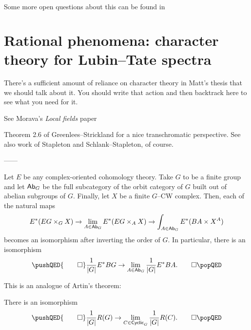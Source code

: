 \begin{remark}
Some more open questions about this can be found in 
\end{remark}








\section{Rational phenomena: character theory for Lubin--Tate spectra}

There's a sufficient amount of reliance on character theory in Matt's thesis that we should talk about it.  You should write that action and then backtrack here to see what you need for it.

See Morava's \textit{Local fields} paper

\begin{remark}
Theorem 2.6 of Greenlees--Strickland for a nice transchromatic perspective.  See also work of Stapleton and Schlank--Stapleton, of course.
\end{remark}


------

\begin{theorem}
Let $E$ be any complex-oriented cohomology theory.  Take $G$ to be a finite group and let $\mathsf{Ab}_G$ be the full subcategory of the orbit category of $G$ built out of abelian subgroups of $G$.  Finally, let $X$ be a finite $G$--CW complex.  Then, each of the natural maps \[E^*(EG \times_G X) \to \lim_{A \in \mathsf{Ab}_G} E^*(EG \times_A X) \to \int_{A \in \mathsf{Ab}_G} E^*(BA \times X^A)\] becomes an isomorphism after inverting the order of $G$.  In particular, there is an isomorphism
\[\pushQED{\qed}
\frac{1}{|G|} E^* BG \to \lim_{A \in \CatOf{Ab}_G} \frac{1}{|G|} E^* BA. \qedhere
\popQED\]
\end{theorem}

This is an analogue of Artin's theorem:
\begin{theorem}
There is an isomorphism
\[\pushQED{\qed}
\frac{1}{|G|} R(G) \to \lim_{C \in \CatOf{Cyclic}_G} \frac{1}{|G|} R(C). \qedhere
\popQED\]
\end{theorem}


